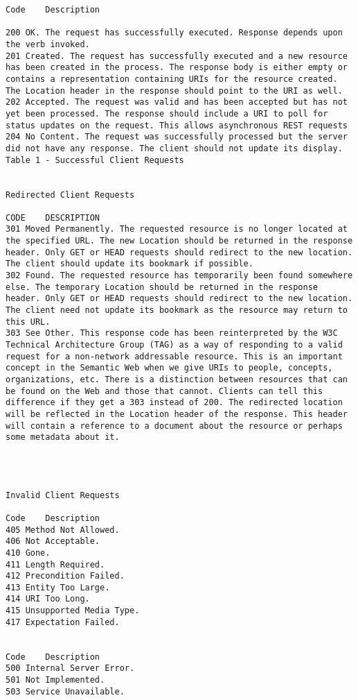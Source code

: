 
\begin{verbatim}
Code	Description

200	OK. The request has successfully executed. Response depends upon the verb invoked.
201	Created. The request has successfully executed and a new resource has been created in the process. The response body is either empty or contains a representation containing URIs for the resource created. The Location header in the response should point to the URI as well.
202	Accepted. The request was valid and has been accepted but has not yet been processed. The response should include a URI to poll for status updates on the request. This allows asynchronous REST requests
204	No Content. The request was successfully processed but the server did not have any response. The client should not update its display.
Table 1 - Successful Client Requests


Redirected Client Requests

CODE	DESCRIPTION
301	Moved Permanently. The requested resource is no longer located at the specified URL. The new Location should be returned in the response header. Only GET or HEAD requests should redirect to the new location. The client should update its bookmark if possible.
302	Found. The requested resource has temporarily been found somewhere else. The temporary Location should be returned in the response header. Only GET or HEAD requests should redirect to the new location. The client need not update its bookmark as the resource may return to this URL.
303	See Other. This response code has been reinterpreted by the W3C Technical Architecture Group (TAG) as a way of responding to a valid request for a non-network addressable resource. This is an important concept in the Semantic Web when we give URIs to people, concepts, organizations, etc. There is a distinction between resources that can be found on the Web and those that cannot. Clients can tell this difference if they get a 303 instead of 200. The redirected location will be reflected in the Location header of the response. This header will contain a reference to a document about the resource or perhaps some metadata about it.




Invalid Client Requests

Code	Description
405	Method Not Allowed.
406	Not Acceptable.
410	Gone.
411	Length Required.
412	Precondition Failed.
413	Entity Too Large.
414	URI Too Long.
415	Unsupported Media Type.
417	Expectation Failed.


Code	Description
500	Internal Server Error.
501	Not Implemented.
503	Service Unavailable.

\end{verbatim}